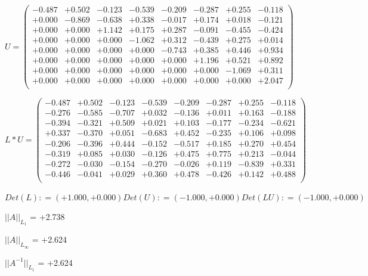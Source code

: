 \documentclass[9pt]{article}
\theoremstyle{plain}
\theoremstyle{definition}
\theoremstyle{remark}
\numberwithin{equation}{section}
\begin{document}
$U = \left(
\begin{array}{
cccccccc}
-0.487 & +0.502 & -0.123 & -0.539 & -0.209 & -0.287 & +0.255 & -0.118 \\
+0.000 & -0.869 & -0.638 & +0.338 & -0.017 & +0.174 & +0.018 & -0.121 \\
+0.000 & +0.000 & +1.142 & +0.175 & +0.287 & -0.091 & -0.455 & -0.424 \\
+0.000 & +0.000 & +0.000 & -1.062 & +0.312 & -0.439 & +0.275 & +0.014 \\
+0.000 & +0.000 & +0.000 & +0.000 & -0.743 & +0.385 & +0.446 & +0.934 \\
+0.000 & +0.000 & +0.000 & +0.000 & +0.000 & +1.196 & +0.521 & +0.892 \\
+0.000 & +0.000 & +0.000 & +0.000 & +0.000 & +0.000 & -1.069 & +0.311 \\
+0.000 & +0.000 & +0.000 & +0.000 & +0.000 & +0.000 & +0.000 & +2.047 \\
\end{array}
\right)$ \newline 

$L * U  = \left(
\begin{array}{
cccccccc}
-0.487 & +0.502 & -0.123 & -0.539 & -0.209 & -0.287 & +0.255 & -0.118 \\
-0.276 & -0.585 & -0.707 & +0.032 & -0.136 & +0.011 & +0.163 & -0.188 \\
-0.394 & -0.321 & +0.509 & +0.021 & +0.103 & -0.177 & -0.234 & -0.621 \\
+0.337 & -0.370 & +0.051 & -0.683 & +0.452 & -0.235 & +0.106 & +0.098 \\
-0.206 & -0.396 & +0.444 & -0.152 & -0.517 & +0.185 & +0.270 & +0.454 \\
-0.319 & +0.085 & +0.030 & -0.126 & +0.475 & +0.775 & +0.213 & -0.044 \\
-0.272 & -0.030 & -0.154 & -0.270 & -0.026 & +0.119 & -0.839 & +0.331 \\
-0.446 & -0.041 & +0.029 & +0.360 & +0.478 & -0.426 & +0.142 & +0.488 \\
\end{array}
\right)$ \newline 

$Det(L) :    = (+1.000,+0.000)     Det(U) :    = (-1.000,+0.000)     Det(LU) :    = (-1.000,+0.000)$

$||A||_{L_1}$  = +2.738

$||A||_{L_{\infty}}$ = +2.624

$||A^{-1}||_{L_1}$  = +2.624
\end{document}
